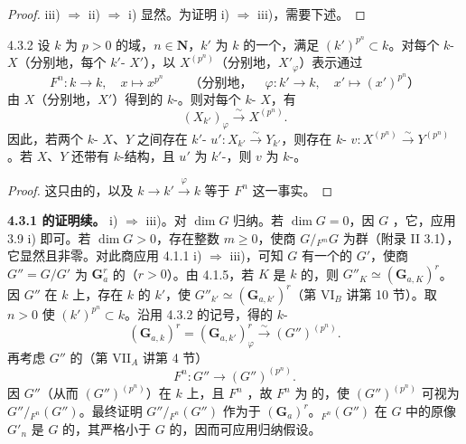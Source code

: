 \begin{proof}
iii) $\Rightarrow$ ii) $\Rightarrow$ i) 显然。为证明 i) $\Rightarrow$ iii)，需要下述。
\end{proof}
\begin{SGAresult}{}{4.3.2}
设 $k$ 为 $p>0$ 的域，$n\in\mathbf N$，$k'$ 为 $k$ 的一个，满足 $(k')^{p^n}\subset k$。对每个 $k$- $X$（分别地，每个 $k'$- $X'$），以 $X^{(p^n)}$（分别地，$X'_\varphi$）表示通过
\[
F^n:k\longrightarrow k,\quad x\longmapsto x^{p^n}
\qquad\text{（分别地，}\quad\varphi:k'\longrightarrow k,\quad x'\longmapsto(x')^{p^n}\text{）}
\]
由 $X$（分别地，$X'$）得到的 $k$-。则对每个 $k$- $X$，有
\[(X_{k'})_\varphi\xrightarrow{\sim}X^{(p^n)}.\]
因此，若两个 $k$- $X$、$Y$ 之间存在 $k'$- $u':X_{k'}\xrightarrow{\sim}Y_{k'}$，则存在 $k$- $v:X^{(p^n)}\xrightarrow{\sim}Y^{(p^n)}$。若 $X$、$Y$ 还带有 $k$-结构，且 $u'$ 为 $k'$-，则 $v$ 为 $k$-。
\end{SGAresult}
\begin{proof}
这只由的，以及 $k\to k'\xrightarrow{\varphi}k$ 等于 $F^n$ 这一事实。
\end{proof}
\textbf{4.3.1 的证明续。}
i) $\Rightarrow$ iii)。对 $\dim G$ 归纳。若 $\dim G=0$，因 $G$ ，它，应用 3.9 i) 即可。若 $\dim G>0$，存在整数 $m\geq0$，使商 $G/{}_{F^m}G$ 为群（附录 II 3.1），它显然且非零。对此商应用 4.1.1 i) $\Rightarrow$ iii)，可知 $G$ 有一个的 $G'$，使商 $G''=G/G'$ 为 $\mathbf G_a^r$ 的（$r>0$）。由 4.1.5，若 $K$ 是 $k$ 的，则 $G''_K\simeq(\mathbf G_{a,K})^r$。因 $G''$ 在 $k$ 上，存在 $k$ 的 $k'$，使 $G''_{k'}\simeq(\mathbf G_{a,k'})^r$（第 VI$_B$ 讲第 10 节）。取 $n>0$ 使 $(k')^{p^n}\subset k$。沿用 4.3.2 的记号，得的 $k$-
\[(\mathbf G_{a,k})^r=(\mathbf G_{a,k'})^r_\varphi\xrightarrow{\sim}(G'')^{(p^n)}.\]
再考虑 $G''$ 的（第 VII$_A$ 讲第 4 节）
\[F^n:G''\longrightarrow(G'')^{(p^n)}.\]
因 $G''$（从而 $(G'')^{(p^n)}$）在 $k$ 上，且 $F^n$ ，故 $F^n$ 为 的，使 $(G'')^{(p^n)}$ 可视为 $G''/{}_{F^n}(G'')$。最终证明 $G''/{}_{F^n}(G'')$ 作为于 $(\mathbf G_a)^r$。${}_{F^n}(G'')$ 在 $G$ 中的原像 $G'_n$ 是 $G$ 的，其严格小于 $G$ 的，因而可应用归纳假设。

